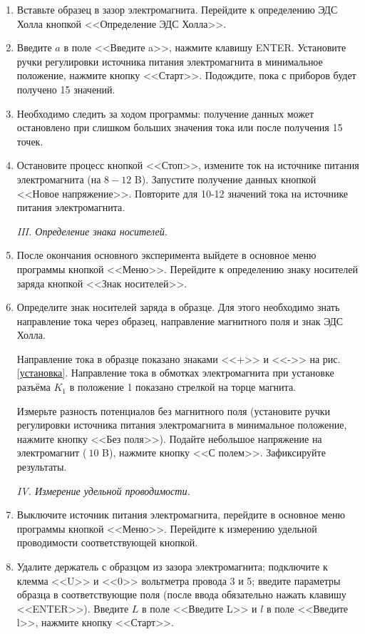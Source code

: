 \documentclass[a4paper,12pt]{article} %
\begin{document}
\begin{enumerate}
  \item Вставьте образец в зазор электромагнита. Перейдите к определению ЭДС Холла кнопкой <<Определение ЭДС Холла>>.
  \item Введите $a$ в поле <<Введите a>>, нажмите клавишу ENTER. Установите ручки регулировки источника питания электромагнита в минимальное положение, нажмите кнопку <<Старт>>. Подождите, пока с приборов будет получено 15 значений.
\item Необходимо следить за ходом программы: получение данных может остановлено при слишком больших значения тока или после получения 15 точек.  
  
  \item Остановите процесс кнопкой  <<Стоп>>, измените ток на источнике питания электромагнита (на $8-12$ B). Запустите получение данных кнопкой  <<Новое напряжение>>. Повторите для 10-12 значений тока на источнике питания электромагнита.
     
\begin{center}
\textit{III. Определение знака носителей.}
\end{center}   

  \item После окончания основного эксперимента выйдете в основное меню программы кнопкой  <<Меню>>. Перейдите к определению знаку носителей заряда кнопкой <<Знак носителей>>.
  \item Определите знак носителей заряда в образце. Для этого необходимо
знать направление тока через образец, направление магнитного поля
и знак ЭДС Холла.

Направление тока в образце показано знаками  <<+>> и  <<->> на рис. \ref{установка}.
Направление тока в обмотках электромагнита при установке разъёма $K_1$ в положение 1 показано стрелкой на торце магнита. 

Измерьте разность потенциалов без магнитного поля (установите ручки регулировки источника питания электромагнита в минимальное положение, нажмите кнопку  <<Без поля>>). Подайте небольшое напряжение на электромагнит ($~10$ B), нажмите кнопку  <<С полем>>. Зафиксируйте результаты.

\begin{center}
\textit{IV. Измерение удельной проводимости.}
\end{center}  

\item Выключите источник питания электромагнита, перейдите в основное меню программы кнопкой  <<Меню>>. Перейдите к измерению удельной проводимости соответствующей кнопкой.
\item Удалите держатель с образцом из зазора электромагнита; подключите к клемма  <<U>> и  <<0>> вольтметра провода 3 и 5; введите параметры образца в соответствующие поля (после ввода обязательно нажать клавишу  <<ENTER>>). Введите $L$  в поле <<Введите L>> и $l$ в поле <<Введите l>>, нажмите кнопку  <<Старт>>.


\end{enumerate}
\end{document}
